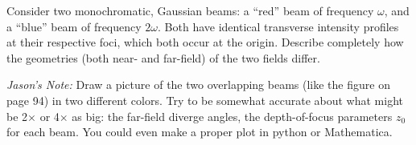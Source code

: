 \documentclass[11pt]{hmcpset}
\begin{document}



\begin{problem}
	Consider two monochromatic, Gaussian beams: a ``red'' beam of frequency $\omega$, and a ``blue'' beam
	of frequency $2\omega$. Both have identical transverse intensity profiles at their respective foci, which both occur at the origin. Describe completely how the geometries (both near- and far-field) of the two fields differ. 
	
	\textit{Jason's Note:} Draw a picture of the two overlapping beams (like the figure on page 94) in two different colors. Try to be somewhat accurate about what might be 2$\times$ or 4$\times$ as big: the far-field diverge angles, the depth-of-focus parameters $z_0$ for each beam. You could even make a proper plot in python or Mathematica.
\end{problem}

\begin{solution}
	\vfill
\end{solution}
\pagebreak
\end{document}
